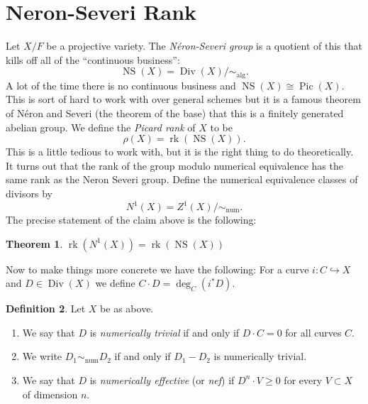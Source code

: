 \documentclass[12pt]{article}
\numberwithin{equation}{section}
\newtheorem{theorem}{Theorem}[subsection]
\theoremstyle{definition}
\newtheorem{definition}[theorem]{Definition}
\theoremstyle{remark}
\newcommand{\Hom}{\operatorname{Hom}}
\newcommand{\Ocal}{\mathcal{O}}
\newcommand{\Div}{\operatorname{Div}}
\newcommand{\Pic}{\operatorname{Pic}}
\newcommand{\rk}{\operatorname{rk}}
\newcommand{\alg}{\operatorname{alg}}
\newcommand{\num}{\operatorname{num}}
\newcommand{\NS}{\operatorname{NS}}
\newcommand{\taylor}[1]{{\color{blue} \sf $\spadesuit\spadesuit\spadesuit$ Taylor: [#1]}}
\begin{document}

\section{Neron-Severi Rank}
Let $X/F$ be a projective variety. 
The \emph{N\'eron-Severi group } is a quotient of this that kills off all of the ``continuous business'':
$$\NS(X) = \Div(X)/\sim_{\alg}.$$
A lot of the time there is no continuous business and $\NS(X) \cong \Pic(X)$. 
This is sort of hard to work with over general schemes but it is a famous theorem of N\'eron and Severi (the theorem of the base) that this is a finitely generated abelian group.
We define the \emph{Picard rank} of $X$ to be 
$$ \rho(X) = \rk(\NS(X)).$$
This is a little tedious to work with, but it is the right thing to do theoretically. 
It turns out that the rank of the group modulo numerical equivalence has the same rank as the Neron Severi group. 
Define the numerical equivalence classes of divisors by 
$$ N^1(X) = Z^1(X)/\sim_{\num}.$$
The precise statement of the claim above is the following:
\begin{theorem}
	$\rk(N^1(X)) =\rk(\NS(X))$
\end{theorem}
Now to make things more concrete we have the following:
For a curve $i:C \hookrightarrow X$ and $D\in \Div(X)$ we define $C\cdot D = \deg_C(i^*D)$.
\begin{definition}
	Let $X$ be as above.
	\begin{enumerate}
		\item We say that $D$ is \emph{numerically trivial} if and only if $D\cdot C=0$ for all curves $C$.
		\item We write $D_1\sim_{\num}D_2$ if and only if $D_1-D_2$ is numerically trivial.
		\item We say that $D$ is \emph{numerically effective} (or \emph{nef}) if $D^n\cdot V \geq 0$ for every $V\subset X$ of dimension $n$. 
	\end{enumerate}
\end{definition}
\end{document}
